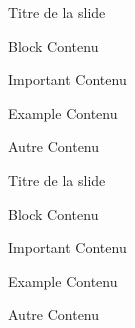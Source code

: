 \begin{frame}{Titre de la slide}
\begin{block}{Block}
Contenu
\end{block}

\begin{alertblock}{Important}
Contenu
\end{alertblock}

\begin{exampleblock}{Example}
Contenu
\end{exampleblock}

\begin{block}{Autre}
Contenu
\end{block}
\end{frame}

\begin{frame}{Titre de la slide}
\begin{block}{Block}
Contenu
\end{block}

\begin{alertblock}{Important}
Contenu
\end{alertblock}

\begin{exampleblock}{Example}
Contenu
\end{exampleblock}

\begin{block}{Autre}
Contenu
\end{block}
\end{frame}


